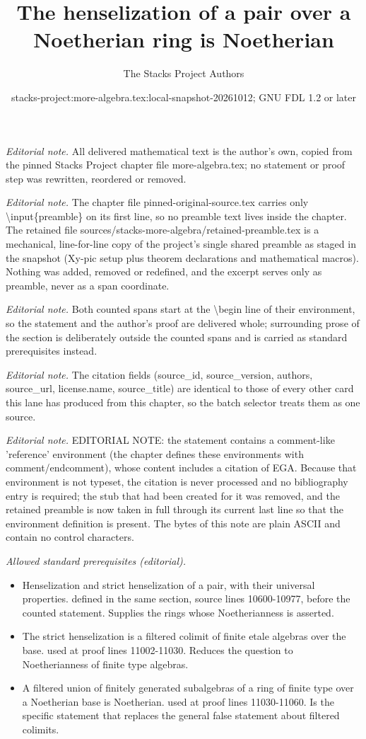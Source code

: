 \documentclass[10pt,a4paper]{amsart}
\title{The henselization of a pair over a Noetherian ring is Noetherian}
\author{The Stacks Project Authors}
\date{stacks-project:more-algebra.tex:local-snapshot-20261012; GNU FDL 1.2 or later}
\theoremstyle{plain}
\theoremstyle{definition}
\theoremstyle{remark}
\numberwithin{equation}{subsection}
\begin{document}
\maketitle
\setcounter{subsection}{1}
\noindent\textit{Editorial note.} All delivered mathematical text is the author's own, copied from the pinned Stacks Project chapter file more-algebra.tex; no statement or proof step was rewritten, reordered or removed.\par\medskip
\noindent\textit{Editorial note.} The chapter file pinned-original-source.tex carries only \textbackslash{}input\{preamble\} on its first line, so no preamble text lives inside the chapter. The retained file sources/stacks-more-algebra/retained-preamble.tex is a mechanical, line-for-line copy of the project's single shared preamble as staged in the snapshot (Xy-pic setup plus theorem declarations and mathematical macros). Nothing was added, removed or redefined, and the excerpt serves only as preamble, never as a span coordinate.\par\medskip
\noindent\textit{Editorial note.} Both counted spans start at the \textbackslash{}begin line of their environment, so the statement and the author's proof are delivered whole; surrounding prose of the section is deliberately outside the counted spans and is carried as standard prerequisites instead.\par\medskip
\noindent\textit{Editorial note.} The citation fields (source\_id, source\_version, authors, source\_url, license.name, source\_title) are identical to those of every other card this lane has produced from this chapter, so the batch selector treats them as one source.\par\medskip
\noindent\textit{Editorial note.} EDITORIAL NOTE: the statement contains a comment-like 'reference' environment (the chapter defines these environments with comment/endcomment), whose content includes a citation of EGA. Because that environment is not typeset, the citation is never processed and no bibliography entry is required; the stub that had been created for it was removed, and the retained preamble is now taken in full through its current last line so that the environment definition is present. The bytes of this note are plain ASCII and contain no control characters.\par\medskip
\noindent\textit{Allowed standard prerequisites (editorial).}\begin{itemize}
\item Henselization and strict henselization of a pair, with their universal properties. defined in the same section, source lines 10600-10977, before the counted statement. Supplies the rings whose Noetherianness is asserted.
\item The strict henselization is a filtered colimit of finite etale algebras over the base. used at proof lines 11002-11030. Reduces the question to Noetherianness of finite type algebras.
\item A filtered union of finitely generated subalgebras of a ring of finite type over a Noetherian base is Noetherian. used at proof lines 11030-11060. Is the specific statement that replaces the general false statement about filtered colimits.
\end{itemize}\medskip
\end{document}
